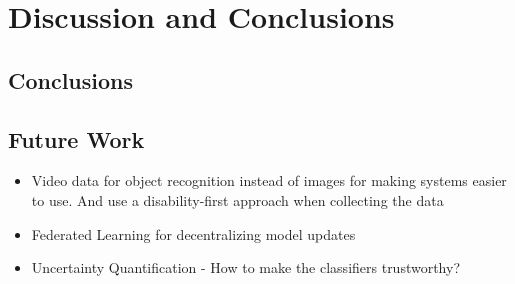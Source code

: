 
\chapter{Discussion and Conclusions}
\label{chap:discussion_and_conclusions}
\noindent %

\section{Conclusions}
\label{sec:conclusions}

\section{Future Work}

\begin{itemize}
	\item Video data for object recognition instead of images for making systems easier to use. And use a disability-first approach when collecting the data
	\item Federated Learning for decentralizing model updates 
	\item Uncertainty Quantification - How to make the classifiers trustworthy?
\end{itemize}



